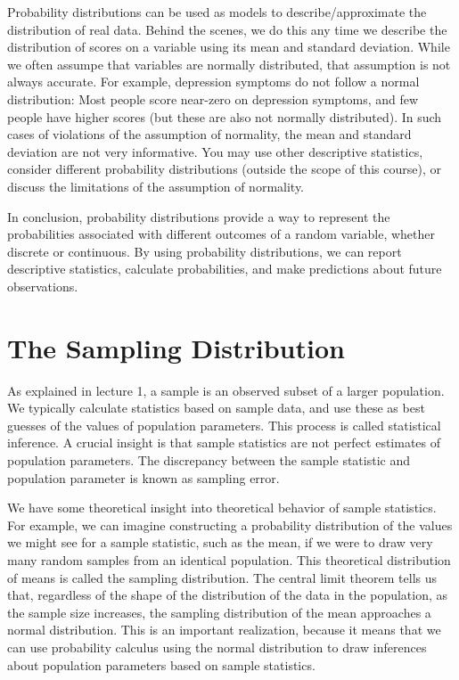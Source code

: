 \documentclass[
  letterpaper,
]{scrbook}
\begin{document}
Probability distributions can be used as models to describe/approximate
the distribution of real data. Behind the scenes, we do this any time we
describe the distribution of scores on a variable using its mean and
standard deviation. While we often assumpe that variables are normally
distributed, that assumption is not always accurate. For example,
depression symptoms do not follow a normal distribution: Most people
score near-zero on depression symptoms, and few people have higher
scores (but these are also not normally distributed). In such cases of
violations of the assumption of normality, the mean and standard
deviation are not very informative. You may use other descriptive
statistics, consider different probability distributions (outside the
scope of this course), or discuss the limitations of the assumption of
normality.

In conclusion, probability distributions provide a way to represent the
probabilities associated with different outcomes of a random variable,
whether discrete or continuous. By using probability distributions, we
can report descriptive statistics, calculate probabilities, and make
predictions about future observations.


\hypertarget{sec-sampdist}{%
\chapter{The Sampling Distribution}\label{sec-sampdist}}

As explained in lecture 1, a sample is an observed subset of a larger
population. We typically calculate statistics based on sample data, and
use these as best guesses of the values of population parameters. This
process is called statistical inference. A crucial insight is that
sample statistics are not perfect estimates of population parameters.
The discrepancy between the sample statistic and population parameter is
known as sampling error.

We have some theoretical insight into theoretical behavior of sample
statistics. For example, we can imagine constructing a probability
distribution of the values we might see for a sample statistic, such as
the mean, if we were to draw very many random samples from an identical
population. This theoretical distribution of means is called the
sampling distribution. The central limit theorem tells us that,
regardless of the shape of the distribution of the data in the
population, as the sample size increases, the sampling distribution of
the mean approaches a normal distribution. This is an important
realization, because it means that we can use probability calculus using
the normal distribution to draw inferences about population parameters
based on sample statistics.
\end{document}
